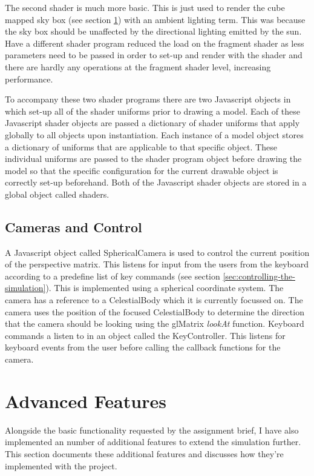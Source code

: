 \documentclass[paper=a4, fontsize=11pt]{scrartcl}	%
\numberwithin{equation}{section}															%
\numberwithin{figure}{section}																%
\numberwithin{table}{section}																%
\begin{document}
The second shader is much more basic. This is just used to render the cube mapped sky box (see section \ref{sec:advanced-features}) with an ambient lighting term. This was because the sky box should be unaffected by the directional lighting emitted by the sun. Have a different shader program reduced the load on the fragment shader as less parameters need to be passed in order to set-up and render with the shader and there are hardly any operations at the fragment shader level, increasing performance.

To accompany these two shader programs there are two Javascript objects in which set-up all of the shader uniforms prior to drawing a model. Each of these Javascript shader objects are passed a dictionary of shader uniforms that apply globally to all objects upon instantiation. Each instance of a model object stores a dictionary of uniforms that are applicable to that specific object. These individual uniforms are passed to the shader program object before drawing the model so that the specific configuration for the current drawable object is correctly set-up beforehand. Both of the Javascript shader objects are stored in a global object called shaders.

\subsection{Cameras and Control}
A Javascript object called SphericalCamera is used to control the current position of the perspective matrix. This listens for input from the users from the keyboard according to a predefine list of key commands (see section \ref{sec:controlling-the-simulation}). This is implemented using a spherical coordinate system. The camera has a reference to a CelestialBody which it is currently focussed on. The camera uses the position of the focused CelestialBody to determine the direction that the camera should be looking using the glMatrix \textit{lookAt} function. Keyboard commands a listen to in an object called the KeyController. This listens for keyboard events from the user before calling the callback functions for the camera.

\section{Advanced Features}
\label{sec:advanced-features}
Alongside the basic functionality requested by the assignment brief, I have also implemented an number of additional features to extend the simulation further. This section documents these additional features and discusses how they're implemented with the project.
\end{document}
